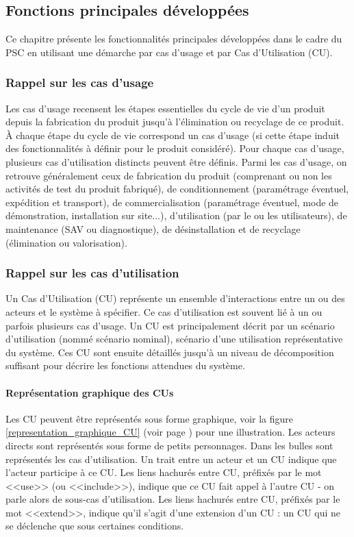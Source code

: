 \newpage
\subsection{Fonctions principales développées}

Ce chapitre présente les fonctionnalités principales développées dans le cadre du PSC en utilisant une démarche par cas d'usage et par Cas d’Utilisation (CU).

\subsubsection{Rappel sur les cas d'usage}

Les cas d'usage recensent les étapes essentielles du cycle de vie d'un produit depuis la fabrication du produit jusqu'à l'élimination ou recyclage de ce produit.
À chaque étape du cycle de vie correspond un cas d'usage (si cette étape induit des fonctionnalités à définir pour le produit considéré). 
Pour chaque cas d'usage, plusieurs cas d'utilisation distincts peuvent être définis.
Parmi les cas d'usage, on retrouve généralement ceux de fabrication du produit (comprenant ou non les activités de test du produit fabriqué), de conditionnement (paramétrage éventuel, expédition et transport), de commercialisation (paramétrage éventuel, mode de démonstration, installation sur site...), d'utilisation (par le ou les utilisateurs), de maintenance (SAV ou diagnostique), de désinstallation et de recyclage (élimination ou valorisation).

\subsubsection{Rappel sur les cas d'utilisation}

Un Cas d’Utilisation (CU) représente un ensemble d’interactions entre un ou des acteurs et le système à spécifier.
Ce cas d'utilisation est souvent lié à un ou parfois plusieurs cas d'usage.
Un CU est principalement décrit par un scénario d’utilisation (nommé scénario nominal), scénario d’une utilisation représentative du système.
Ces CU sont ensuite détaillés jusqu’à un niveau de décomposition suffisant pour décrire les fonctions attendues du système.

\paragraph{Représentation graphique des CUs}

Les CU peuvent être représentés sous forme graphique, voir la figure \ref{representation_graphique_CU} (voir page \pageref{representation_graphique_CU}) pour une illustration.
Les acteurs directs sont représentés sous forme de petits personnages.
Dans les bulles sont représentés les cas d’utilisation.
Un trait entre un acteur et un CU indique que l’acteur participe à ce CU. 
Les liens hachurés entre CU, préfixés par le mot <<use>> (ou <<include>>), indique que ce CU fait appel à l’autre CU - on parle alors de sous-cas d’utilisation. 
Les liens hachurés entre CU, préfixés par le mot <<extend>>, indique qu’il s’agit d’une extension d’un CU : un CU qui ne se déclenche que sous certaines conditions.

